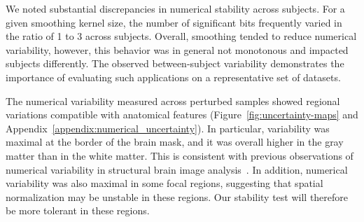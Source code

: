 \documentclass[lettersize,journal]{IEEEtran}
\begin{document}
We noted substantial discrepancies in numerical stability across subjects. For a given smoothing kernel size, the number of significant bits frequently varied in the ratio of 1 to 3 across subjects. Overall, smoothing tended to reduce numerical variability, however, this behavior was in general not monotonous and impacted subjects differently. The observed between-subject variability
demonstrates the importance of evaluating such applications on a representative set of datasets.

The numerical variability measured across perturbed samples showed regional variations compatible with anatomical features (Figure~\ref{fig:uncertainty-maps} and Appendix~\ref{appendix:numerical_uncertainty}). In particular, variability was
maximal at the border of the brain mask, and it was overall higher in the gray matter than in the white matter.
This is consistent with previous observations of numerical variability in structural brain image analysis~\cite{salari2021accurate}.
In addition, numerical variability was also maximal in some focal regions, suggesting that spatial normalization may be unstable in these regions. Our stability test will therefore be more tolerant in these regions.


\end{document}
